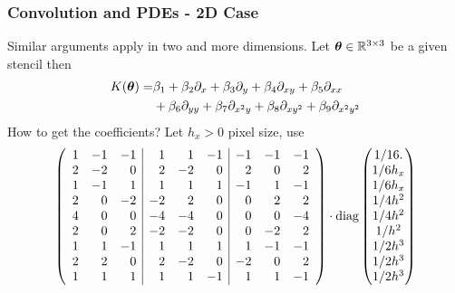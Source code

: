 \documentclass[12pt,fleqn,handout]{beamer}
\begin{document}
\begin{frame}
	\frametitle{Convolution and PDEs - 2D Case}
	
	Similar arguments apply in two and more dimensions. Let ${\boldsymbol \theta}\in\mathbb{R}^{3\times 3}$ be a given stencil then
	\begin{align*}
		K({\boldsymbol \theta}) =&  \beta_1  + \beta_2 \partial_x + \beta_3 \partial_y + \beta_4 \partial_{xy} + \beta_5 \partial_{xx} \\
		& + \beta_6 \partial_{yy} + \beta_7 \partial_{x^2y} + \beta_8 \partial_{xy^2} + \beta_9 \partial_{x^2y^2}
	\end{align*}
	How to get the coefficients? Let $h_x>0$ pixel size, use 
	$$
		\left(
		\begin{array}{rrr|rrr|rrr}
			1 & -1 & -1 &  1 &  1 & -1 & -1 & -1 & -1\\ 
			2 & -2 &  0 &  2 & -2 &  0 &  2 &  0 &  2\\ 
			1 & -1 &  1 &  1 &  1 &  1 & -1 &  1 & -1\\ 
			2 &  0 & -2 & -2 &  2 &  0 &  0 &  2 &  2\\ 
			4 &  0 &  0 & -4 & -4 &  0 &  0 &  0 & -4\\ 
			2 &  0 &  2 & -2 & -2 &  0 &  0 & -2 &  2\\ 
			1 &  1 & -1 &  1 &  1 &  1 &  1 & -1 & -1\\ 
			2 &  2 &  0 &  2 & -2 &  0 & -2 &  0 &  2\\ 
			1 &  1 &  1 &  1 &  1 & -1 &  1 &  1 & -1\\ 
		\end{array}
		\right)
		\cdot {\rm diag}
		\begin{pmatrix}
			1/16.  \\
			1/6h_x \\
			1/6h_x \\
			1/4h^2 \\
			1/4h^2 \\
			1/h^2  \\
			1/2h^3 \\
			1/2h^3 \\
			1/2h^3
		\end{pmatrix}
	$$
	
\end{frame}
\end{document}
